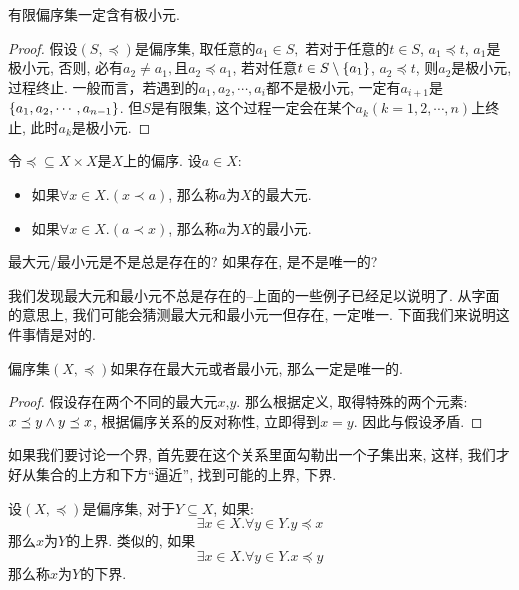 \begin{theorem}
	有限偏序集一定含有极小元.
\end{theorem}

\begin{proof}
	假设$(S,\preceq)$是偏序集, 取任意的$a_1\in S,$ 若对于任意的$t\in S$, $a_1\preceq t$, $a_1$是极小元, 否则, 必有$a_2\neq a_1,$且$a_2\preceq a_1$, 若对任意$t\in S\setminus\{a_1\}$, $a_2\preceq t$, 则$a_2$是极小元, 过程终止. 一般而言，若遇到的$a_1,a_2,\cdots, a_i$都不是极小元, 一定有$a_{i+1}$是$\{a_1,a_2,\cdots, a_{n-1}\}$. 但$S$是有限集, 这个过程一定会在某个$a_k(k=1,2,\cdots,n)$上终止, 此时$a_k$是极小元. 
\end{proof}


\begin{definition}
	令$\preceq\subseteq X \times X$是$X$上的偏序. 设$a\in X$: 
\begin{itemize}
		\item 如果$\forall x\in X. (x\prec a)$, 那么称$a$为$X$的最大元.
		\item 如果$\forall x\in X. (a\prec x)$, 那么称$a$为$X$的最小元.
	\end{itemize} 

\end{definition}
	
\begin{bonus}
	最大元/最小元是不是总是存在的? 如果存在, 是不是唯一的? 
\end{bonus}

我们发现最大元和最小元不总是存在的--上面的一些例子已经足以说明了. 从字面的意思上, 我们可能会猜测最大元和最小元一但存在, 一定唯一. 下面我们来说明这件事情是对的. 

\begin{theorem}[极大元极小元唯一性]
	偏序集$(X,\preceq)$如果存在最大元或者最小元, 那么一定是唯一的. 
\end{theorem}

\begin{proof}
	假设存在两个不同的最大元$x$,$y$. 那么根据定义, 取得特殊的两个元素: $x\preceq y \land y\preceq x$, 根据偏序关系的反对称性, 立即得到$x=y$. 因此与假设矛盾. 
\end{proof}

如果我们要讨论一个界, 首先要在这个关系里面勾勒出一个子集出来, 这样, 我们才好从集合的上方和下方``逼近'', 找到可能的上界, 下界. 

\begin{definition}[上界与下界]
	设$(X,\preceq)$是偏序集, 对于$Y \subseteq X$, 如果:
	$$
	\exists x\in X. \forall y\in Y. y\preceq x
	$$
	那么$x$为$Y$的上界. 类似的, 如果
	$$
	\exists x\in X. \forall y\in Y. x\preceq y
	$$
	那么称$x$为$Y$的下界. 
\end{definition}

